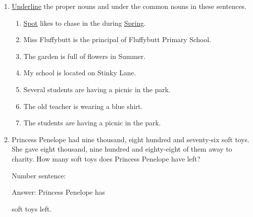 \documentclass{tufte-book}
\begin{document}
\begin{enumerate}
  \item {}
  \underline{Underline} the proper nouns and  under the common nouns in these sentences.
  \begin{enumerate}
    \item \underline{Spot} likes to chase  in the  during \underline{Spring}.
    \item Miss Fluffybutt is the principal of Fluffybutt Primary School.
    \item The garden is full of flowers in Summer.
    \item My school is located on Stinky Lane.
    \item Several students are having a picnic in the park.
    \item The old teacher is wearing a blue shirt.
    \item The students are having a picnic in the park.
  \end{enumerate}

  \item Princess Penelope had nine thousand, eight hundred and seventy-six soft toys.
  She gave eight thousand, nine hundred and eighty-eight of them away to charity. 
  How many soft toys does Princess Penelope have left?\bigskip\par
  Number sentence: \dotfill\bigskip\par
  Answer: Princess Penelope has \dotfill\bigskip\par\dotfill\bigskip soft toys left.


\end{enumerate}
\end{document}
